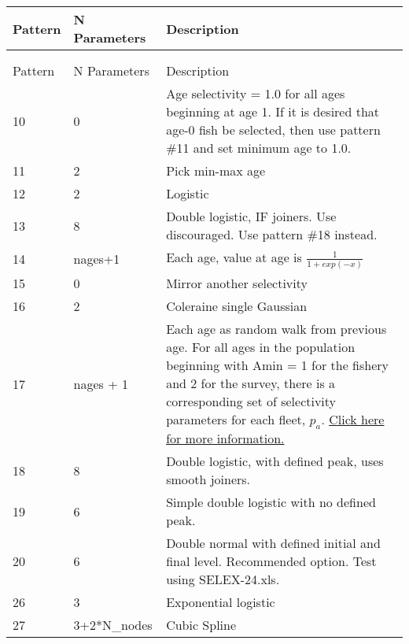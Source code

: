 \begin{center}
	\begin{longtable}{p{2cm} p{3cm} p{10cm}}

		\endfirsthead

		\hline
		Pattern & N Parameters & Description \\
		\hline
		\endhead

		\endfoot
		\endlastfoot

		\hline
		\multicolumn{3}{c}{AGE SELECTIVITY}\\
		   &   &  \\
		Pattern & N Parameters & Description \\
		\hline
		10 & 0 & Age selectivity = 1.0 for all ages beginning at age 1.  If it is desired that age-0 fish be selected, then use pattern \#11 and set minimum age to 1.0. \\
		11 & 2 & Pick min-max age\\
		12 & 2 & Logistic\\
		13 & 8 & Double logistic, IF joiners.  Use discouraged.  Use pattern \#18 instead.\\
		14 & nages+1 & Each age, value at age is $\frac{1}{1+exp(-x)}$ \\
		15 & 0 & Mirror another selectivity\\
		16 & 2 & Coleraine single Gaussian\\
		17 & nages + 1 & Each age as random walk from previous age.  For all ages in the population beginning with Amin = 1 for the fishery and 2 for the survey, there is a corresponding set of selectivity parameters for each fleet, $p_a$. \hyperlink{RandWalk}{Click here for more information.}\\
		18 & 8 & Double logistic, with defined peak, uses smooth joiners.  \\
		19 & 6 & Simple double logistic with no defined peak.\\
		20 & 6 & Double normal with defined initial and final level.  Recommended option. Test using SELEX-24.xls.\\
		26 & 3 & Exponential logistic\\
		27 & 3+2*N\_nodes & Cubic Spline\\
		\hline
	\end{longtable}
\end{center}

